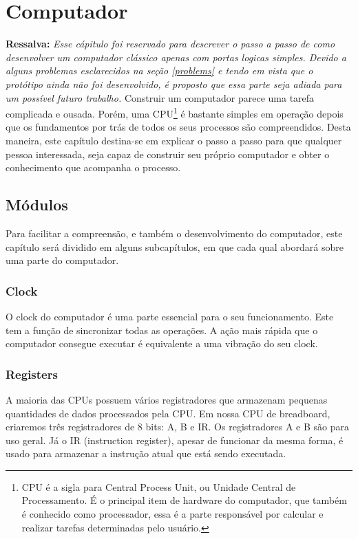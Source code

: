 \section{Computador} 
\textbf{Ressalva: }
\textit{ Esse cápitulo foi reservado para descrever o passo a passo de como desenvolver um computador clássico apenas com portas logicas simples. Devido a alguns problemas esclarecidos na seção \ref{problems} e tendo em vista que o protótipo ainda não foi desenvolvido, é proposto que essa parte seja adiada para um possível futuro trabalho.}
\newline
\newline
Construir um computador parece uma tarefa complicada e ousada. Porém, uma CPU\footnote{CPU é a sigla para Central Process Unit, ou Unidade Central de Processamento. É o principal item de hardware do computador, que também é conhecido como processador, essa é a parte responsável por calcular e realizar tarefas determinadas pelo usuário.} é bastante simples em operação depois que os fundamentos por trás de todos os seus processos são compreendidos. Desta maneira, este capítulo destina-se em explicar o passo a passo para que qualquer pessoa interessada, seja capaz de construir seu próprio computador e obter o conhecimento que acompanha o processo.

\subsection{Módulos}
Para facilitar a compreensão, e também o desenvolvimento do computador, este capítulo será dividido em alguns subcapítulos, em que cada qual abordará sobre uma parte do computador.

\subsubsection{Clock}
O clock do computador é uma parte essencial para o seu funcionamento. Este tem a função de sincronizar todas as operações. A ação mais rápida que o computador consegue executar é equivalente a uma vibração do seu clock.

\subsubsection{Registers}
A maioria das CPUs possuem vários registradores que armazenam pequenas quantidades de dados processados pela CPU. Em nossa CPU de breadboard, criaremos três registradores de 8 bits: A, B e IR. Os registradores A e B são para uso geral. Já o IR (instruction register), apesar de funcionar da mesma forma, é usado para armazenar a instrução atual que está sendo executada.

